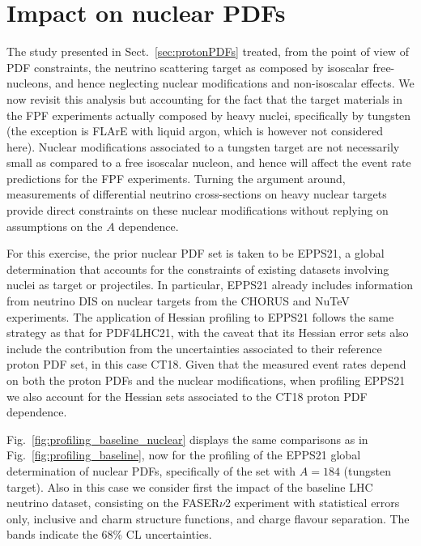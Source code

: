 \clearpage
\section{Impact on nuclear PDFs}
\label{sec:nuclearPDFs}

The study presented in Sect.~\ref{sec:protonPDFs} treated, from the point of view
of PDF constraints, the neutrino scattering target
as composed by isoscalar free-nucleons, and hence neglecting nuclear modifications
and non-isoscalar effects.
%
We now revisit this analysis but accounting for the fact that the target materials in the FPF
experiments actually
composed by heavy nuclei, specifically by tungsten (the exception is FLArE with liquid argon, which
is however not considered here).
%
Nuclear modifications associated to a tungsten target are not necessarily small as compared
to a free isoscalar nucleon, and hence will affect the event rate predictions for
the FPF experiments.
%
Turning the argument around, measurements of differential neutrino cross-sections
on heavy nuclear targets provide direct constraints on these nuclear modifications
without replying on assumptions on the $A$ dependence.

For this exercise, the prior nuclear PDF set is taken to be EPPS21, a global determination
that accounts for the constraints of existing datasets involving nuclei as target or projectiles.
%
In particular, EPPS21 already includes information from neutrino DIS on nuclear targets
from the CHORUS and NuTeV experiments.
%
The application of Hessian profiling to EPPS21 follows the same strategy as that
for PDF4LHC21, with the caveat that its Hessian error sets also include the contribution
from the uncertainties  associated to their reference proton PDF set, in this case CT18.
%
Given that the measured event rates depend on both the proton PDFs and the nuclear modifications,
when profiling EPPS21 we also account for the Hessian sets associated to the CT18 proton
PDF dependence.

Fig.~\ref{fig:profiling_baseline_nuclear} displays the same comparisons
as in Fig.~\ref{fig:profiling_baseline},
now for the profiling of the EPPS21 global determination of nuclear PDFs,
specifically of the set with $A=184$ (tungsten target).
%
Also in this case we consider first the impact of the baseline LHC neutrino dataset, consisting
on the FASER$\nu$2 experiment
with statistical errors only, inclusive and charm structure functions,  and charge flavour
separation.
%
The bands indicate the 68\% CL uncertainties.

